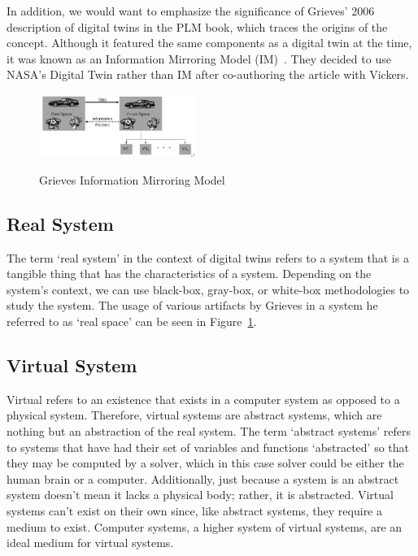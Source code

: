 \documentclass[9pt,conference]{IEEEtran}
\begin{document}
    In addition, we would want to emphasize the significance of Grieves' 2006 description of digital twins in the PLM book,
    which traces the origins of the concept. Although it featured the same components as a digital twin at the time, it was known as an Information Mirroring Model (IM)~\cite{GrievesPLMBook}. 
    They decided to use NASA's Digital Twin rather than IM after co-authoring the article with Vickers.

    \begin{figure}
        \centering
        \includegraphics[width =0.45\textwidth]{GrievesInformationMirroringModel.png}
        \caption{Grieves Information Mirroring Model}\label{fig:GrievesInformationMirroringModel}
        \cite{GrievesPLMBook}
    \end{figure}

    \subsection*{Real System}

    The term `real system' in the context of digital twins refers to a system that is a tangible thing that has the characteristics of a system. Depending on the system's context, we can use black-box, gray-box, or white-box methodologies to study the system. 
    The usage of various artifacts by Grieves in a system he referred to as `real space' can be seen in Figure~\ref{fig:GrievesInformationMirroringModel}.

    \subsection*{Virtual System}
    Virtual refers to an existence that exists in a computer system as opposed to a physical system. Therefore, virtual systems are abstract systems, which are nothing but an abstraction of the real system.
    The term `abstract systems' refers to systems that have had their set of variables and functions `abstracted' so that they may be computed by a solver, which in this case solver could be either the human brain or a computer.
    Additionally, just because a system is an abstract system doesn't mean it lacks a physical body; rather, it is abstracted. 
    Virtual systems can't exist on their own since, like abstract systems, they require a medium to exist. Computer systems, a higher system of virtual systems, are an ideal medium for virtual systems.
    
\end{document}
